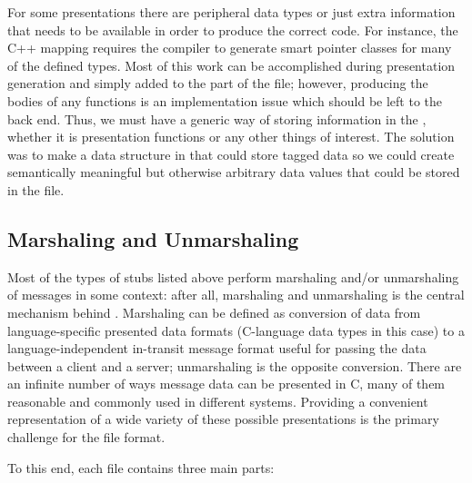 For some presentations there are peripheral data types or just extra
information that needs to be available in order to produce the correct code.
For instance, the \CORBA{} C++ mapping requires the \IDL{} compiler to generate
smart pointer classes for many of the defined types.  Most of this work can be
accomplished during presentation generation and simply added to the \CAST{}
part of the \PRESC{} file; however, producing the bodies of any functions is an
implementation issue which should be left to the back end.  Thus, we must have
a generic way of storing information in the \PRESC{}, whether it is
presentation functions or any other things of interest.  The solution was to
make a data structure in \XDR{} that could store tagged data so we could create
semantically meaningful but otherwise arbitrary data values that could be
stored in the \PRESC{} file.



\subsection{Marshaling and Unmarshaling}
\label{subsec:PRESC:Marshaling and Unmarshaling}

Most of the types of stubs listed above perform marshaling and/or unmarshaling
of messages in some context: after all, marshaling and unmarshaling is the
central mechanism behind \RPC{}\@.  Marshaling can be defined as conversion of
data from language-specific presented data formats (C-language data types in
this case) to a language-independent in-transit message format useful for
passing the data between a client and a server; unmarshaling is the opposite
conversion.  There are an infinite number of ways message data can be presented
in C, many of them reasonable and commonly used in different \RPC{} systems.
Providing a convenient representation of a wide variety of these possible
presentations is the primary challenge for the \PRESC{} file format.

To this end, each \PRESC{} file contains three main parts:

